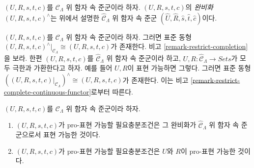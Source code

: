 \begin{definition}
\label{definition-completion-groupoid-in-functors}
$(U, R, s, t, c)$를 $\mathcal{C}_\Lambda$ 위 함자 속 준군이라 하자.
$(U, R, s, t, c)$의 {\it 완비화 $(U, R, s, t, c)^{\wedge}$}는
위에서 설명한 $\widehat{\mathcal{C}}_\Lambda$ 위 함자 속 준군
$(\widehat{U}, \widehat{R}, \widehat{s}, \widehat{t}, \widehat{c})$이다.
\end{definition}

\begin{remark}
\label{remark-groupoid-in-functors-complete-restrict}
$(U, R, s, t, c)$를 $\mathcal{C}_\Lambda$ 위 함자 속 준군이라 하자.
그러면 표준 동형
$(U, R, s, t, c)^{\wedge}|_{\mathcal{C}_\Lambda} \cong (U, R, s, t, c)$가
존재한다. 비고 \ref{remark-restrict-completion}을 보라.
한편 $(U, R, s, t, c)$를 $\widehat{\mathcal{C}}_\Lambda$ 위 함자 속
준군이라 하고, $U, R : \widehat{\mathcal{C}}_\Lambda \to \textit{Sets}$가
모두 극한과 가환한다고 하자. 예를 들어 $U, R$이 표현 가능하면 그렇다.
그러면 표준 동형
$((U, R, s, t, c)|_{\mathcal{C}_\Lambda})^{\wedge} \cong (U, R, s, t, c)$가
존재한다. 이는 비고
\ref{remark-restrict-complete-continuous-functor}로부터 따른다.
\end{remark}

\begin{lemma}
\label{lemma-groupoid-in-functors-prorep-equivalences}
$(U, R, s, t, c)$를 $\mathcal{C}_\Lambda$ 위 함자 속 준군이라 하자.
\begin{enumerate}
\item $(U, R, s, t, c)$가 pro-표현 가능할 필요충분조건은 그 완비화가
$\widehat{\mathcal{C}}_\Lambda$ 위 함자 속 준군으로서 표현 가능한 것이다.
\item $(U, R, s, t, c)$가 pro-표현 가능할 필요충분조건은 $U$와 $R$이
pro-표현 가능한 것이다.
\end{enumerate}
\end{lemma}

